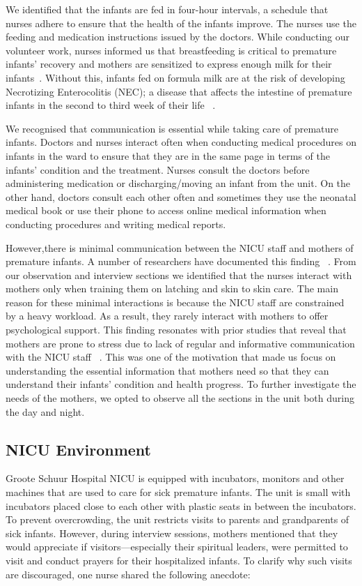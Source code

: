We identified that the infants are fed in four-hour intervals, a schedule that nurses adhere to ensure that the health of the infants improve. The nurses use the feeding and medication instructions issued by the doctors. While conducting our volunteer work, nurses informed us that breastfeeding is critical to premature infants’ recovery and mothers are sensitized to express enough milk for their infants~\citep{Kapembwa2017, Updegrove2013}. Without this, infants fed on formula milk are at the risk of developing Necrotizing Enterocolitis (NEC); a disease that affects the intestine of premature infants in the second to third week of their life ~\citep{Updegrove2013}. 

We recognised that communication is essential while taking care of premature infants. Doctors and nurses interact often when conducting medical procedures on infants in the ward to ensure that they are in the same page in terms of the infants' condition and the treatment. Nurses consult the doctors before administering medication or discharging/moving an infant from the unit. On the other hand, doctors consult each other often and sometimes they use the neonatal medical book or use their phone to access online medical information when conducting procedures and writing medical reports.  

However,there is minimal communication between the NICU staff and mothers of premature infants.  A number of researchers have documented this finding ~\citep{Griffin1998, Pascoe2016, Jones2015}. From our observation and interview sections we identified that the nurses interact with mothers only when training them on latching and skin to skin care. The main reason for these minimal interactions is because the NICU staff are constrained by a heavy workload. As a result, they rarely interact with mothers to offer psychological support. This finding resonates with prior studies that  reveal that  mothers are prone to stress due to lack of regular and informative communication with the NICU staff ~\citep{Orzalesi2011,HadianShirazi2015, VandeVijver2015}. This was one of the motivation that made us focus on understanding the essential information that mothers need so that they can understand their infants’ condition and health progress. To further investigate the needs of the mothers, we opted to observe all the sections in the unit both during the day and night.  

\subsection{NICU Environment}
Groote Schuur Hospital NICU is equipped with incubators, monitors and other machines that are used to care for sick premature infants. The unit is small with incubators placed close to each other with plastic seats in between the incubators. To prevent overcrowding, the unit restricts visits to parents and grandparents of sick infants. However, during interview sessions, mothers mentioned that they would appreciate if visitors---especially their spiritual leaders, were permitted to visit and conduct prayers for their hospitalized infants. To clarify why such visits are discouraged, one nurse shared the following anecdote:

